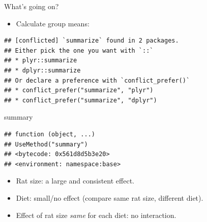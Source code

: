 \documentclass[ignorenonframetext,]{beamer}
\newenvironment{Shaded}{\begin{snugshade}}{\end{snugshade}}
\newcommand{\DataTypeTok}[1]{\textcolor[rgb]{0.13,0.29,0.53}{#1}}
\newcommand{\KeywordTok}[1]{\textcolor[rgb]{0.13,0.29,0.53}{\textbf{#1}}}
\newcommand{\NormalTok}[1]{#1}
\newcommand{\OperatorTok}[1]{\textcolor[rgb]{0.81,0.36,0.00}{\textbf{#1}}}
\newcommand{\StringTok}[1]{\textcolor[rgb]{0.31,0.60,0.02}{#1}}
\providecommand{\tightlist}{%
  \setlength{\itemsep}{0pt}\setlength{\parskip}{0pt}}
\begin{document}
\begin{frame}[fragile]{What's going on?}
\protect\hypertarget{whats-going-on}{}

\begin{itemize}
\tightlist
\item
  Calculate group means:
\end{itemize}

\footnotesize

\begin{Shaded}
\end{Shaded}

\begin{verbatim}
## [conflicted] `summarize` found in 2 packages.
## Either pick the one you want with `::` 
## * plyr::summarize
## * dplyr::summarize
## Or declare a preference with `conflict_prefer()`
## * conflict_prefer("summarize", "plyr")
## * conflict_prefer("summarize", "dplyr")
\end{verbatim}

\begin{Shaded}
\begin{Highlighting}[]
\NormalTok{summary}
\end{Highlighting}
\end{Shaded}

\begin{verbatim}
## function (object, ...) 
## UseMethod("summary")
## <bytecode: 0x561d8d5b3e20>
## <environment: namespace:base>
\end{verbatim}

\normalsize

\begin{itemize}
\item
  Rat size: a large and consistent effect.
\item
  Diet: small/no effect (compare same rat size, different diet).
\item
  Effect of rat size \emph{same} for each diet: no interaction.
\end{itemize}

\end{frame}
\end{document}
